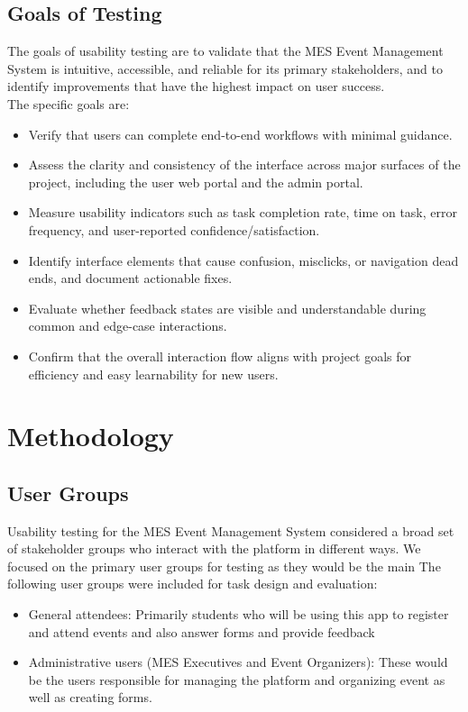 \documentclass[12pt]{article}
\begin{document}
\subsection{Goals of Testing}
The goals of usability testing are to validate that the MES Event Management System is intuitive, accessible, and reliable for its primary stakeholders, and to identify improvements that have the highest impact on user success.\\
The specific goals are:
\begin{itemize}
    \item Verify that users can complete end-to-end workflows with minimal guidance.
    \item Assess the clarity and consistency of the interface across major surfaces of the project, including the user web portal and the admin portal.
    \item Measure usability indicators such as task completion rate, time on task, error frequency, and user-reported confidence/satisfaction.
    \item Identify interface elements that cause confusion, misclicks, or navigation dead ends, and document actionable fixes.
    \item Evaluate whether feedback states are visible and understandable during common and edge-case interactions.
    \item Confirm that the overall interaction flow aligns with project goals for efficiency and easy learnability for new users.
\end{itemize}
\section{Methodology}
\subsection{User Groups}
Usability testing for the MES Event Management System considered a broad set of stakeholder groups who interact with the platform in different ways. We focused on the primary user groups for testing as they would be the main The following user groups were included for task design and evaluation:

\begin{itemize}
    \item General attendees: Primarily students who will be using this app to register and attend events and also answer forms and provide feedback
    \item Administrative users (MES Executives and Event Organizers): These would be the users responsible for managing the platform and organizing event as well as creating forms.
\end{itemize}
\end{document}
